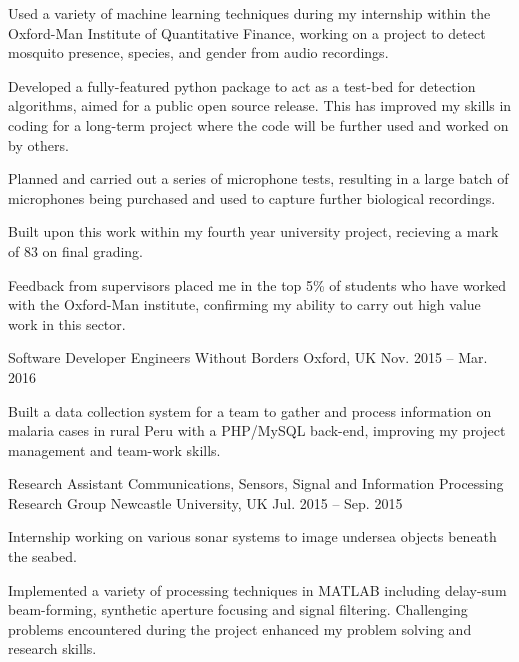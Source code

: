 \begin{cventries}
{\begin{cvitems}
        \item {Used a variety of machine learning techniques during my internship within the Oxford-Man Institute of Quantitative Finance, working on a project to detect mosquito presence, species, and gender from audio recordings.}
        \item {Developed a fully-featured python package to act as a test-bed for detection algorithms, aimed for a public open source release. This has improved my skills in coding for a long-term project where the code will be further used and worked on by others.}
        \item {Planned and carried out a series of microphone tests, resulting in a large batch of microphones being purchased and used to capture further biological recordings.}
        \item {Built upon this work within my fourth year university project, recieving a mark of 83 on final grading.}
        \item{Feedback from supervisors placed me in the top 5\% of students who have worked with the Oxford-Man institute, confirming my ability to carry out high value work in this sector.}
      \end{cvitems}
    }
    \cventry
    {Software Developer}
    {Engineers Without Borders}
    {Oxford, UK}
    {Nov. 2015 – Mar. 2016}
    {
      \begin{cvitems}
        \item {Built a data collection system for a team to gather and process information on malaria cases in rural Peru with a PHP/MySQL back-end, improving my project management and team-work skills.}
      \end{cvitems}
    }
  \cventry
    {Research Assistant}
    {Communications, Sensors, Signal and Information Processing Research Group}
    {Newcastle University, UK}
    {Jul. 2015 – Sep. 2015}
    {
      \begin{cvitems}
        \item {Internship working on various sonar systems to image undersea objects beneath the seabed.}
        \item {Implemented a variety of processing techniques in MATLAB including delay-sum beam-forming, synthetic
aperture focusing and signal filtering. Challenging problems encountered during the project enhanced my problem solving and research skills.}
      \end{cvitems}
    }
\end{cventries}
